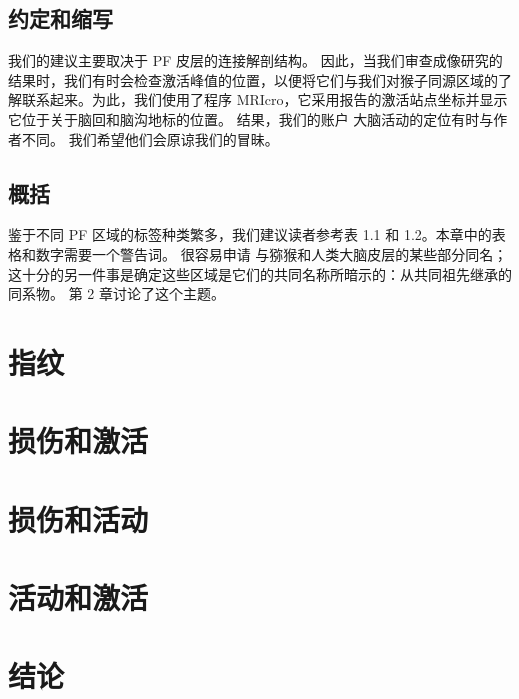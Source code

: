 \subsection{约定和缩写}
我们的建议主要取决于 PF 皮层的连接解剖结构。 因此，当我们审查成像研究的结果时，我们有时会检查激活峰值的位置，以便将它们与我们对猴子同源区域的了解联系起来。为此，我们使用了程序 MRIcro，它采用报告的激活站点坐标并显示它位于关于脑回和脑沟地标的位置。 结果，我们的账户
大脑活动的定位有时与作者不同。 我们希望他们会原谅我们的冒昧。
\subsection{概括}
鉴于不同 PF 区域的标签种类繁多，我们建议读者参考表 1.1 和 1.2。本章中的表格和数字需要一个警告词。 很容易申请
与猕猴和人类大脑皮层的某些部分同名； 这十分的另一件事是确定这些区域是它们的共同名称所暗示的：从共同祖先继承的同系物。 第 2 章讨论了这个主题。
\par
\par






\section{指纹}

\section{损伤和激活}

\section{损伤和活动}

\section{活动和激活}




\section{结论}


